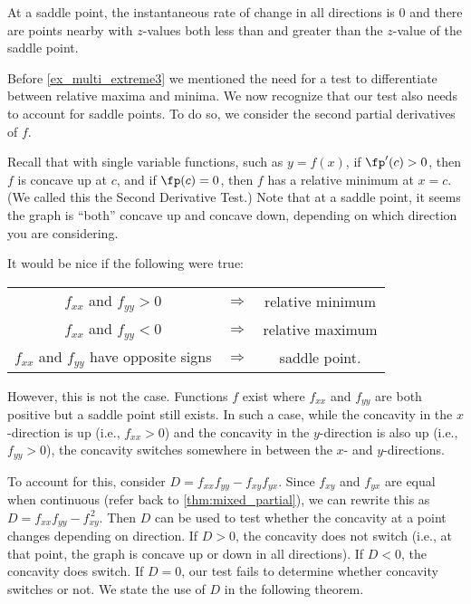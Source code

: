 At a saddle point, the instantaneous rate of change in all directions is 0 and there are points nearby with $z$-values both less than and greater than the $z$-value of the saddle point.

Before \autoref{ex_multi_extreme3} we mentioned the need for a test to differentiate between relative maxima and minima. We now recognize that our test also needs to account for saddle points. To do so, we consider the second partial derivatives of $f$.

Recall that with single variable functions, such as $y=f(x)$, if $\fp'(c)>0$, then $f$ is concave up at $c$, and if $\fp(c) =0$, then $f$ has a relative minimum at $x=c$. (We called this the Second Derivative Test.) Note that at a saddle point, it seems the graph is ``both'' concave up and concave down, depending on which direction you are considering.

It would be nice if the following were true:
\begin{center}
	\begin{tabular}{ccc}
	$f_{xx}$ and $f_{yy} >0$ & $\Rightarrow$ & relative minimum\\
	$f_{xx}$ and $f_{yy} <0$ & $\Rightarrow$ & relative maximum\\
	$f_{xx}$ and $f_{yy}$ have opposite signs & $\Rightarrow$ & saddle point.
	\end{tabular}
\end{center}

However, this is not the case. Functions $f$ exist where $f_{xx}$ and $f_{yy}$ are both positive  but a saddle point still exists. In such a case, while the concavity in the $x$-direction is up (i.e., $f_{xx}>0$) and the concavity in the $y$-direction is also up (i.e., $f_{yy}>0$), the concavity switches somewhere in between the $x$- and $y$-directions.

To account for this, consider $D = f_{xx}f_{yy}-f_{xy}f_{yx}$. Since $f_{xy}$ and $f_{yx}$ are equal when continuous (refer back to \autoref{thm:mixed_partial}), we can rewrite this as $D = f_{xx}f_{yy}-f_{xy}^{\,2}$. Then $D$ can be used to test whether the concavity at a point changes depending on direction. If $D>0$, the concavity does not switch (i.e., at that point, the graph is concave up or down in all directions). If $D<0$, the concavity does switch. If $D=0$, our test fails to determine whether concavity switches or not. We state the use of $D$ in the following theorem.

